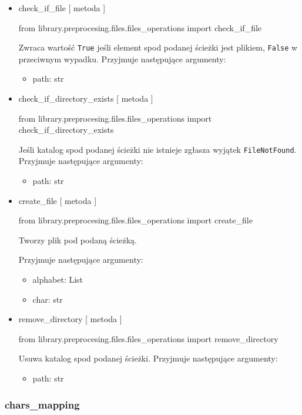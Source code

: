 \begin{itemize}
\item{check\_if\_file [ metoda ] }
\begin{import}
from library.preprocesing.files.files_operations import check_if_file
\end{import}
Zwraca wartość \texttt{True} jeśli element spod podanej ścieżki jest plikiem, \texttt{False} w przeciwnym wypadku.
Przyjmuje następujące argumenty:
\begin{itemize}
	\item path: str
\end{itemize}

\item{check\_if\_directory\_exists [ metoda ] }
\begin{import}
from library.preprocesing.files.files_operations import check_if_directory_exists
\end{import}
Jeśli katalog spod podanej ścieżki nie istnieje zgłasza wyjątek \texttt{FileNotFound}.
Przyjmuje następujące argumenty:
\begin{itemize}
	\item path: str
\end{itemize}

\item{create\_file [ metoda ] }
\begin{import}
from library.preprocesing.files.files_operations import create_file
\end{import}
Tworzy plik pod podaną ścieżką. 

Przyjmuje następujące argumenty:
\begin{itemize}
	\item alphabet: List
	\item char: str
\end{itemize}

\item{remove\_directory [ metoda ] }
\begin{import}
from library.preprocesing.files.files_operations import remove_directory
\end{import}

Usuwa katalog spod podanej ścieżki.
Przyjmuje następujące argumenty:
\begin{itemize}
	\item path: str
\end{itemize}

\end{itemize}

\newpage

\subsubsection{chars\_mapping}

